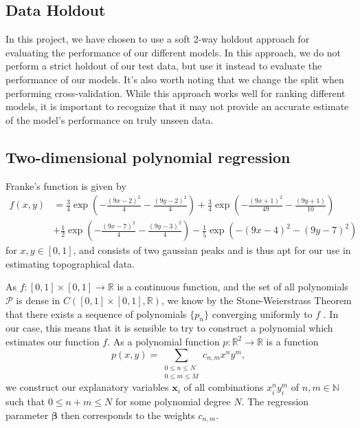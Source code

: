 \documentclass{article}
\begin{document}
\subsection{Data Holdout}
In this project, we have chosen to use a soft 2-way holdout approach for evaluating the performance of our different models. In this approach, we do not perform a strict holdout of our test data, but use it instead to evaluate the performance of our models. It's also worth noting that we change the split when performing cross-validation. While this approach works well for ranking different models, it is important to recognize that it may not provide an accurate estimate of the model's performance on truly unseen data. 

\subsection{Two-dimensional polynomial regression}
Franke's function is given by
\begin{equation*}
    \begin{split}
        f(x,y) & = \frac{3}{4}\exp\left(-\frac{(9x-2)^2}{4} - \frac{(9y-2)^2}{4}\right) + \frac{3}{4}\exp\left(-\frac{(9x+1)^2}{49} - \frac{(9y+1)}{10}\right) \\
        & + \frac{1}{2}\exp\left(-\frac{(9x-7)^2}{4} - \frac{(9y-3)^2}{4}\right) - \frac{1}{5}\exp\left(-(9x-4)^2 - (9y-7)^2\right)
    \end{split}
\end{equation*}
for $x, y \in [0, 1]$, and consists of two gaussian peaks and is thus apt for our use in estimating topographical data.

As $f: [0,1] \times [0, 1] \to \mathbb{R}$ is a continuous function, and the set of all polynomials $\mathcal{P}$ is dense in $C([0,1] \times [0,1], \mathbb{R})$, we know by the Stone-Weierstrass Theorem that there exists a sequence of polynomials $\{p_n\}$ converging uniformly to $f$ \cite[p.~116--129]{lindstrom2017spaces}. In our case, this means that it is sensible to try to construct a polynomial which estimates our function $f$. As a polynomial function $p: \mathbb{R}^2 \to \mathbb{R}$ is a function
\begin{equation*}
    p(x,y) = \sum_{\substack{0 \leq n \leq N \\ 0 \leq m \leq M}} c_{n,m} x^n y^m,
\end{equation*}
we construct our explanatory variables $\boldsymbol{x}_i$ of all combinations $x_i^n y_i^m$ of $n,m \in \mathbb{N}$ such that $0 \leq n + m \leq N$ for some polynomial degree $N$. The regression parameter $\boldsymbol{\beta}$ then corresponds to the weights $c_{n,m}$.
\end{document}
